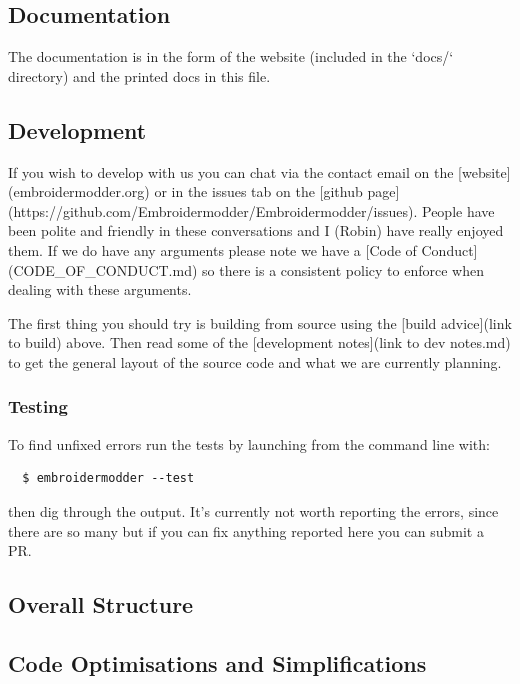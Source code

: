 \documentclass[a4paper, 11pt]{report}
\begin{document}
\subsection{Documentation}

The documentation is in the form of the website (included in the `docs/`
directory) and the printed docs in this file.

\subsection{Development}

If you wish to develop with us you can chat via the contact email
on the [website](embroidermodder.org) or in the issues tab on the
[github page](https://github.com/Embroidermodder/Embroidermodder/issues).
People have been polite and friendly in these conversations and I (Robin)
have really enjoyed them.
If we do have any arguments please note we have a
[Code of Conduct](CODE\_OF\_CONDUCT.md) so there is a consistent policy to
enforce when dealing with these arguments.

The first thing you should try is building from source using the [build advice](link to build)
above. Then read some of the [development notes](link to dev notes.md) to get the general
layout of the source code and what we are currently planning.

\subsubsection{Testing}

To find unfixed errors run the tests by launching from the command line with:

\begin{verbatim}
  $ embroidermodder --test
\end{verbatim}

then dig through the output. It's currently not worth reporting the errors, since
there are so many but if you can fix anything reported here you can submit a PR.

\subsection{Overall Structure}

\subsection{Code Optimisations and Simplifications}
\end{document}
